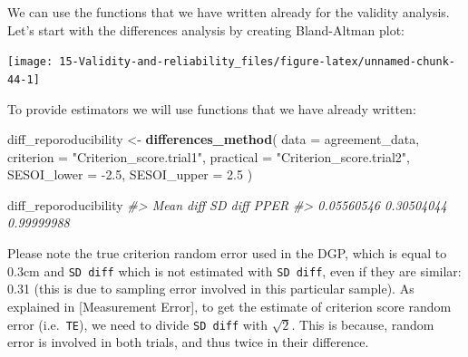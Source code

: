 \documentclass[
]{book}
\newenvironment{Shaded}{\begin{snugshade}}{\end{snugshade}}
\newcommand{\CommentTok}[1]{\textcolor[rgb]{0.56,0.35,0.01}{\textit{#1}}}
\newcommand{\DataTypeTok}[1]{\textcolor[rgb]{0.13,0.29,0.53}{#1}}
\newcommand{\FloatTok}[1]{\textcolor[rgb]{0.00,0.00,0.81}{#1}}
\newcommand{\KeywordTok}[1]{\textcolor[rgb]{0.13,0.29,0.53}{\textbf{#1}}}
\newcommand{\NormalTok}[1]{#1}
\newcommand{\OperatorTok}[1]{\textcolor[rgb]{0.81,0.36,0.00}{\textbf{#1}}}
\newcommand{\StringTok}[1]{\textcolor[rgb]{0.31,0.60,0.02}{#1}}
\begin{document}
We can use the functions that we have written already for the validity analysis. Let's start with the differences analysis by creating Bland-Altman plot:

\begin{Shaded}
\end{Shaded}

\begin{center}\texttt{[image: 15-Validity-and-reliability\_files/figure-latex/unnamed-chunk-44-1]} \end{center}

To provide estimators we will use functions that we have already written:

\begin{Shaded}
\begin{Highlighting}[]
\NormalTok{diff\_reporoducibility <{-}}\StringTok{ }\KeywordTok{differences\_method}\NormalTok{(}
  \DataTypeTok{data =}\NormalTok{ agreement\_data,}
  \DataTypeTok{criterion =} \StringTok{"Criterion\_score.trial1"}\NormalTok{,}
  \DataTypeTok{practical =} \StringTok{"Criterion\_score.trial2"}\NormalTok{,}
  \DataTypeTok{SESOI\_lower =} \FloatTok{{-}2.5}\NormalTok{,}
  \DataTypeTok{SESOI\_upper =} \FloatTok{2.5}
\NormalTok{)}

\NormalTok{diff\_reporoducibility}
\CommentTok{\#>  Mean diff    SD diff       PPER }
\CommentTok{\#> 0.05560546 0.30504044 0.99999988}
\end{Highlighting}
\end{Shaded}

Please note the true criterion random error used in the DGP, which is equal to 0.3cm and \texttt{SD\ diff} which is not estimated with \texttt{SD\ diff}, even if they are similar: 0.31 (this is due to sampling error involved in this particular sample). As explained in {[}Measurement Error{]}, to get the estimate of criterion score random error (i.e.~\texttt{TE}), we need to divide \texttt{SD\ diff} with \(\sqrt{2}\). This is because, random error is involved in both trials, and thus twice in their difference.
\end{document}
